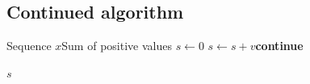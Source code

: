 \documentclass[algorithms,listings]{tempusreport}
\begin{document}
\subsection{Continued algorithm}
\begin{algorithm}[htbp]
\caption{Filter and aggregate, first part.}\label{alg:continued}
\begin{algorithmic}[1]
\Require Sequence $x$\Ensure Sum of positive values
\State $s\gets0$
\State $s\gets s+v$\Else\State \textbf{continue}\EndIf
\EndFor
{}
\end{algorithmic}
\end{algorithm}
\clearpage
\begin{algorithm}[htbp]
\begin{algorithmic}[1]
\State \Return $s$
\EndFunction
\end{algorithmic}
\end{algorithm}
\end{document}
